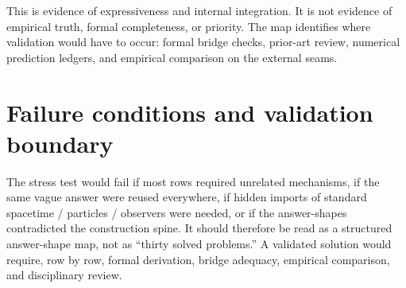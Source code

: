 \documentclass{pantarhei-researchnote}
\begin{document}
This is evidence of expressiveness and internal integration. It is not
evidence of empirical truth, formal completeness, or priority. The map
identifies where validation would have to occur: formal bridge checks,
prior-art review, numerical prediction ledgers, and empirical comparison on
the external seams.

\section{Failure conditions and validation boundary}

The stress test would fail if most rows required unrelated mechanisms, if the
same vague answer were reused everywhere, if hidden imports of standard
spacetime / particles / observers were needed, or if the answer-shapes
contradicted the construction spine. It should therefore be read as a
structured answer-shape map, not as ``thirty solved problems.'' A validated
solution would require, row by row, formal derivation, bridge adequacy,
empirical comparison, and disciplinary review.

\nocite{PR-I,PR-II,PR-III,PR-IV,PR-V,BareMetalSpine2026}
\begingroup
\footnotesize


\endgroup
\end{document}
